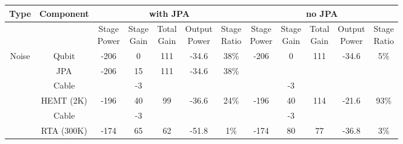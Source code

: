 \documentclass[a4paper,onecolumn,11pt,unpublished]{quantumarticle}
\begin{document}
\begin{table}
  \centering
  \footnotesize
  \setlength{\tabcolsep}{4.5pt}
  \begin{tabular}{cc|ccccc|ccccc}
    \hline \hline
    Type                   & Component       & \multicolumn{5}{c|}{with JPA} & \multicolumn{5}{c}{no JPA}                                                         \\
    \hline
                           &                 & \makecell{Stage                                                                                                    \\ Power} & \makecell{Stage \\ Gain} & \makecell{Total \\ Gain} & \makecell{Output \\ Power} & \makecell{Stage \\ Ratio}
                           & \makecell{Stage                                                                                                                      \\ Power} & \makecell{Stage \\ Gain} & \makecell{Total \\ Gain} & \makecell{Output \\ Power} & \makecell{Stage \\ Ratio}         \\
    \hline
    \multirow{7}{*}{Noise} & Qubit           & -206                          & 0                          & 111  & -34.6 & 38\% & -206 & 0   & 111 & -34.6 & 5\%  \\
                           & JPA             & -206                          & 15                         & 111  & -34.6 & 38\% &      &     &     &       &      \\
                           & Cable           &                               & -3                         &      &       &      &      & -3  &     &       &      \\
                           & HEMT (2K)       & -196                          & 40                         & 99   & -36.6 & 24\% & -196 & 40  & 114 & -21.6 & 93\% \\
                           & Cable           &                               & -3                         &      &       &      &      & -3  &     &       &      \\
                           & RTA (300K)      & -174                          & 65                         & 62   & -51.8 & 1\%  & -174 & 80  & 77  & -36.8 & 3\%  \\

\end{tabular}
\end{table}
\end{document}
